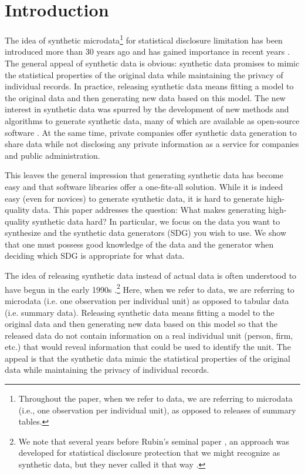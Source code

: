 \documentclass[runningheads]{llncs}
\begin{document}
\section{Introduction}
The idea of synthetic microdata\footnote{Throughout the paper, when we refer to data, we are referring to microdata (i.e., one observation per individual unit), as opposed to releases of summary tables.} for statistical disclosure limitation has been introduced more than 30 years ago \cite{rubin1993statistical,little1993statistical,liew1985data} and has gained importance in recent years \cite{drechsler2022challenges,jordon2022synthetic}. The general appeal of synthetic data is obvious: synthetic data promises to mimic the statistical properties of the original data while maintaining the privacy of individual records. In practice, releasing synthetic data means fitting a model to the original data and then generating new data based on this model.  The new interest in synthetic data was spurred by the development of new methods and algorithms to generate synthetic data, many of which are available as open-source software \cite[see, e.g., ][]{nowok2016synthpop,ping2017datasynthesizer,ctgan}. At the same time, private companies offer synthetic data generation to share data while not disclosing any private information as a service for companies and public administration.

This leaves the general impression that generating synthetic data has become easy and that software libraries offer a one-fits-all solution. While it is indeed easy (even for novices) to generate synthetic data, it is hard to generate high-quality data. This paper addresses the question: What makes generating high-quality synthetic data hard? In particular, we focus on the data you want to synthesize and the synthetic data generators (SDG) you wish to use. We show that one must possess good knowledge of the data and the generator when deciding which SDG is appropriate for what data. 

The idea of releasing synthetic data instead of actual data is often understood to have begun in the early 1990s \cite{rubin1993statistical,little1993statistical}.\footnote{We note that several years before Rubin's seminal paper \cite{rubin1993statistical}, an approach was developed for statistical disclosure protection that we might recognize as synthetic data, but they never called it that way \cite{liew1985data}.}  Here, when we refer to data, we are referring to microdata (i.e. one observation per individual unit) as opposed to tabular data (i.e. summary data).  Releasing synthetic data means fitting a model to the original data and then generating new data based on this model so that the released data do not contain information on a real individual unit (person, firm, etc.) that would reveal information that could be used to identify the unit.  The appeal is that the synthetic data mimic the statistical properties of the original data while maintaining the privacy of individual records.
\end{document}
